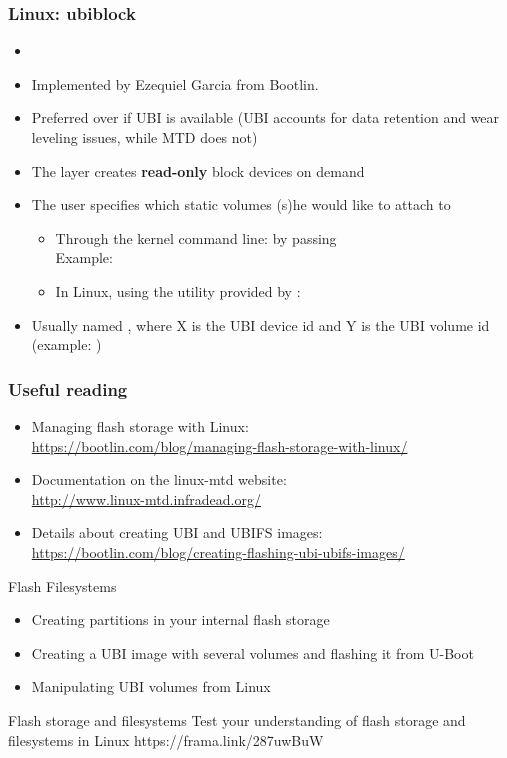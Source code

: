 \begin{frame}
  \frametitle{Linux: ubiblock}
  \begin{itemize}
  \item {}
  \item Implemented by Ezequiel Garcia from Bootlin.
  \item Preferred over  if UBI is available (UBI accounts
    for data retention and wear leveling issues, while MTD does not)
  \item The  layer creates {\bf read-only} block devices
    on demand
  \item The user specifies which static volumes (s)he would like to attach
    to 
    \begin{itemize}
    \item Through the kernel command line: by passing
      \\
      Example: \\
    \item In Linux, using the  utility provided by :
    \end{itemize}
   \item Usually named , where X is the UBI device
     id and Y is the UBI volume id (example: )
  \end{itemize}
\end{frame}

\begin{frame}
  \frametitle{Useful reading}
  \begin{itemize}
  \item Managing flash storage with Linux:\\
    \url{https://bootlin.com/blog/managing-flash-storage-with-linux/}
  \item Documentation on the linux-mtd website:\\
    \url{http://www.linux-mtd.infradead.org/}
  \item Details about creating UBI and UBIFS images:\\
    \url{https://bootlin.com/blog/creating-flashing-ubi-ubifs-images/}
  \end{itemize}
\end{frame}

\setuplabframe
{Flash Filesystems}
{
  \begin{itemize}
  \item Creating partitions in your internal flash storage
  \item Creating a UBI image with several volumes and flashing it from
    U-Boot
  \item Manipulating UBI volumes from Linux
  \end{itemize}
}

\quizframe
{Flash storage and filesystems}
{Test your understanding of flash storage and filesystems in Linux}
{https://frama.link/287uwBuW}
